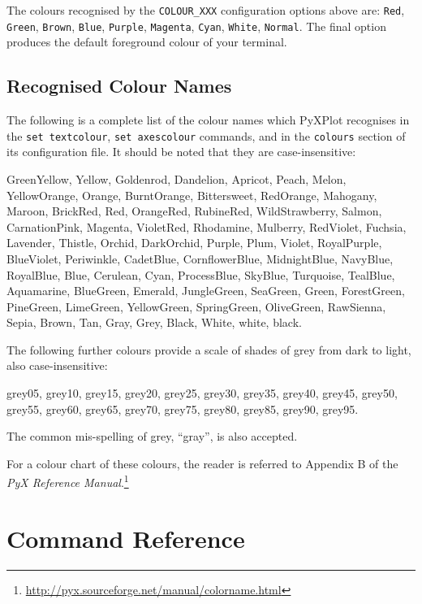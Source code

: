 \documentclass[a4paper,onecolumn,11pt]{book}
\begin{document}
The colours recognised by the \texttt{COLOUR\_XXX} configuration options above are: \texttt{Red}, \texttt{Green}, \texttt{Brown}, \texttt{Blue}, \texttt{Purple}, \texttt{Magenta}, \texttt{Cyan}, \texttt{White}, \texttt{Normal}. The final option produces the default foreground colour of your terminal.

\section{Recognised Colour Names}
\label{colour_names}

The following is a complete list of the colour names which PyXPlot recognises in the \texttt{set textcolour}, \texttt{set axescolour} commands, and in the \texttt{colours} section of its configuration file. It should be noted that they are case-insensitive:

GreenYellow, Yellow, Goldenrod, Dandelion, Apricot, Peach, Melon, YellowOrange, Orange, BurntOrange, Bittersweet, RedOrange, Mahogany, Maroon, BrickRed, Red, OrangeRed, RubineRed, WildStrawberry, Salmon, CarnationPink, Magenta, VioletRed, Rhodamine, Mulberry, RedViolet, Fuchsia, Lavender, Thistle, Orchid, DarkOrchid, Purple, Plum, Violet, RoyalPurple, BlueViolet, Periwinkle, CadetBlue, CornflowerBlue, MidnightBlue, NavyBlue, RoyalBlue, Blue, Cerulean, Cyan, ProcessBlue, SkyBlue, Turquoise, TealBlue, Aquamarine, BlueGreen, Emerald, JungleGreen, SeaGreen, Green, ForestGreen, PineGreen, LimeGreen, YellowGreen, SpringGreen, OliveGreen, RawSienna, Sepia, Brown, Tan, Gray, Grey, Black, White, white, black.

The following further colours provide a scale of shades of grey from dark to light, also case-insensitive:

grey05, grey10, grey15, grey20, grey25, grey30, grey35, grey40, grey45, grey50, grey55, grey60, grey65, grey70, grey75, grey80, grey85, grey90, grey95.

The common mis-spelling of grey, ``gray'', is also accepted.

For a colour chart of these colours, the reader is referred to Appendix B of the \textit{PyX Reference Manual}.\footnote{\url{http://pyx.sourceforge.net/manual/colorname.html}}

\chapter{Command Reference}
\end{document}
